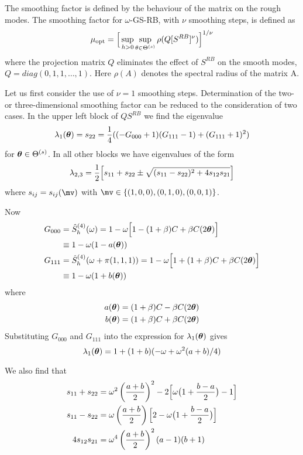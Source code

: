 \documentclass[12pt]{article}
\begin{document}
The smoothing factor is defined by the behaviour of the matrix on the rough modes.
The smoothing factor for $\omega$-GS-RB, with $\nu$ smoothing steps, is defined as 
\[
  \mu_{\rm opt} = \Big[ \sup_{h>0} \sup_{\theta\in\Theta^{(s)}} \rho( Q [S^{RB}]^\nu ) \Big]^{1/\nu}
\]
where the projection matrix $Q$ eliminates the effect of $S^{RB}$ on the smooth modes,
$Q=diag(0,1,1,\dots,1)$.  Here $\rho(A)$ denotes the spectral radius of the matrix A.


Let us first consider the use of $\nu=1$ smoothing steps.
Determination of the two- or three-dimensional smoothing factor
can be reduced to the consideration of two cases. 
In the upper left block of $Q S^{RB}$ we find the eigenvalue
\[
  \lambda_1(\boldsymbol{\theta}) = s_{22} = {1\over 4}( (-G_{000}+1)(G_{111}-1) + (G_{111}+1)^2 )
\]
for $\boldsymbol{\theta}\in\Theta^{(s)}$.
In all other blocks we have eigenvalues of the form
\[
  \lambda_{2,3} = {1\over 2}\Big[ s_{11}+s_{22} \pm \sqrt{ (s_{11}-s_{22})^2 + 4 s_{12}s_{21} } \Big]
\]
where $s_{ij}=s_{ij}(\mv)$ with $\mv\in \{(1,0,0),(0,1,0),(0,0,1)\}$.

Now
\begin{align*}
G_{000} &= \hat{S}_h^{(4)}(\omega) = 1-\omega\Big[ 1 - (1+\beta)C + \beta C(2\boldsymbol{\theta}) \Big] \\
        & \equiv 1-\omega( 1- a(\boldsymbol{\theta}) ) \\
G_{111} &= \hat{S}_h^{(4)}(\omega+\pi(1,1,1)) = 1-\omega\Big[ 1 + (1+\beta)C + \beta C(2\boldsymbol{\theta}) \Big] \\
        & \equiv 1-\omega( 1 + b(\boldsymbol{\theta}) ) 
\end{align*}
where
\begin{align*}
   a(\boldsymbol{\theta})=(1+\beta)C - \beta C(2\boldsymbol{\theta}) \\
   b(\boldsymbol{\theta})=(1+\beta)C + \beta C(2\boldsymbol{\theta})
\end{align*}
Substituting $G_{000}$ and $G_{111}$ into the expression for $\lambda_1(\boldsymbol{\theta})$ gives
\[
  \lambda_1(\boldsymbol{\theta}) = 1 + (1+b) ( -\omega + \omega^2(a+b)/4 )
\]


We also find that
\begin{align*}
  s_{11}+s_{22} &= \omega^2 \left( {a+b\over 2} \right)^2 - 2\Big[ \omega\big( 1 + {b-a\over 2} \big) -1 \Big] \\
  s_{11}-s_{22} &= \omega\left( {a+b\over 2}\right) \Big[ 2-\omega\big( 1 + {b-a\over 2} \big)\Big] \\ 
  4 s_{12}s_{21}&= \omega^4 \left( {a+b\over 2}\right)^2 (a-1)(b+1)
\end{align*}
\end{document}
